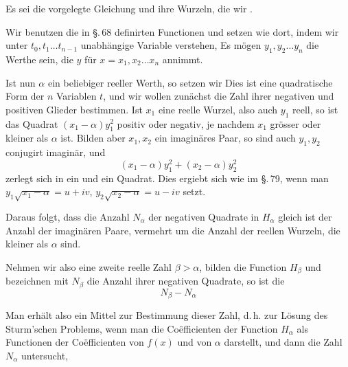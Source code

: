 Es sei
die vorgelegte Gleichung und
ihre Wurzeln, die wir .

Wir benutzen die in \S.\,68 definirten Functionen
und setzen wie dort, indem wir unter $t_0, t_1 \ldots t_{n-1}$ unabh\"angige Variable verstehen,
Es m\"ogen $y_1, y_2 \ldots y_n$ die Werthe sein, die $y$ f\"ur $x = x_1, x_2 \ldots x_n$ annimmt.

Ist nun $\alpha$ ein beliebiger reeller Werth, so setzen wir
Dies ist eine quadratische Form der $n$ Variablen $t$, und wir wollen zun\"achst die Zahl ihrer negativen und positiven Glieder bestimmen. Ist $x_1$ eine reelle Wurzel, also auch $y_1$ reell, so ist das Quadrat $(x_1-\alpha)y_1^2$ positiv oder negativ, je nachdem $x_1$ gr\"osser oder kleiner als $\alpha$ ist. Bilden aber $x_1, x_2$ ein imagin\"ares Paar, so sind auch $y_1, y_2$ conjugirt imagin\"ar, und
\[ (x_1-\alpha)y_1^2 + (x_2-\alpha)y_2^2 \]
zerlegt sich in ein  und ein  Quadrat. Dies ergiebt sich wie im \S.\,79, wenn man $y_1\sqrt{x_1-\alpha} = u+iv$, $y_2\sqrt{x_2-\alpha} = u-iv$ setzt.

Daraus folgt, dass die Anzahl $N_\alpha$ der negativen Quadrate in $H_\alpha$ gleich ist der Anzahl der imagin\"aren Paare, vermehrt um die Anzahl der reellen Wurzeln, die kleiner als $\alpha$ sind.

Nehmen wir also eine zweite reelle Zahl $\beta > \alpha$, bilden die Function $H_\beta$ und bezeichnen mit $N_\beta$ die Anzahl ihrer negativen Quadrate, so ist die 
\[ N_\beta - N_\alpha \]

Man erh\"alt also ein Mittel zur Bestimmung dieser Zahl, d.\,h. zur L\"osung des Sturm'schen Problems, wenn man die Co\"efficienten der Function $H_\alpha$ als Functionen der Co\"efficienten von $f(x)$ und von $\alpha$ darstellt, und dann die Zahl $N_\alpha$ untersucht,
